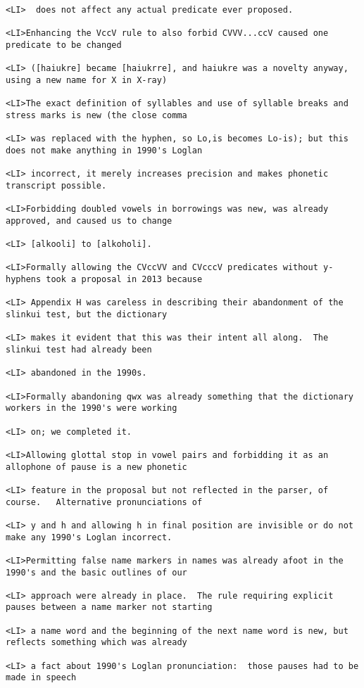 \documentclass[12pt]{article}
\begin{document}
\begin{lstlisting}
<LI>  does not affect any actual predicate ever proposed.

<LI>Enhancing the VccV rule to also forbid CVVV...ccV caused one predicate to be changed

<LI> ([haiukre] became [haiukrre], and haiukre was a novelty anyway, using a new name for X in X-ray)

<LI>The exact definition of syllables and use of syllable breaks and stress marks is new (the close comma

<LI> was replaced with the hyphen, so Lo,is becomes Lo-is); but this does not make anything in 1990's Loglan

<LI> incorrect, it merely increases precision and makes phonetic transcript possible.

<LI>Forbidding doubled vowels in borrowings was new, was already approved, and caused us to change

<LI> [alkooli] to [alkoholi].

<LI>Formally allowing the CVccVV and CVcccV predicates without y-hyphens took a proposal in 2013 because

<LI> Appendix H was careless in describing their abandonment of the slinkui test, but the dictionary

<LI> makes it evident that this was their intent all along.  The slinkui test had already been

<LI> abandoned in the 1990s.

<LI>Formally abandoning qwx was already something that the dictionary workers in the 1990's were working

<LI> on; we completed it.

<LI>Allowing glottal stop in vowel pairs and forbidding it as an allophone of pause is a new phonetic

<LI> feature in the proposal but not reflected in the parser, of course.   Alternative pronunciations of

<LI> y and h and allowing h in final position are invisible or do not make any 1990's Loglan incorrect.

<LI>Permitting false name markers in names was already afoot in the 1990's and the basic outlines of our

<LI> approach were already in place.  The rule requiring explicit pauses between a name marker not starting

<LI> a name word and the beginning of the next name word is new, but reflects something which was already

<LI> a fact about 1990's Loglan pronunciation:  those pauses had to be made in speech


\end{lstlisting}
\end{document}

